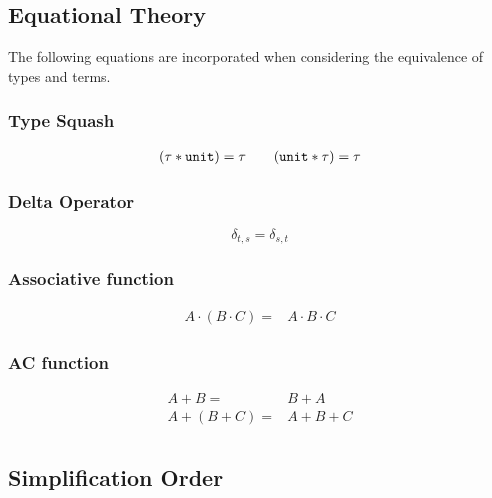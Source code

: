 

\subsection{Equational Theory}
The following equations are incorporated when considering the equivalence of types and terms.

\subsubsection*{Type Squash}
\begin{gather*}
  (\tau * \texttt{unit})  = \tau \qquad (\texttt{unit} * \tau) = \tau \\
\end{gather*}

\subsubsection*{Delta Operator}
$$
    \delta_{t, s} = \delta_{s, t}
$$

\subsubsection*{Associative function}
\begin{align*}
    A \cdot (B \cdot C) = & A \cdot B \cdot C
\end{align*}

\subsubsection*{AC function}
\begin{align*}
    A + B = & B + A \\
    A + (B + C) = & A + B + C \\
\end{align*}


\subsection{Simplification Order}


